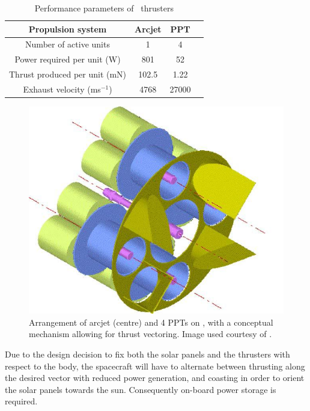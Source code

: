 \begin{table} [h]
\caption{Performance parameters of \BW\ thrusters}
\label{tab:BW1-performance}
\centering
\begin{tabular} {cccc}\toprule
  Propulsion system & Arcjet & PPT \\\midrule
  Number of active units & 1 & 4 \\
  Power required per unit (W) & 801 & 52\\
  Thrust produced per unit (mN) & 102.5 & 1.22\\
  Exhaust velocity (ms$^{-1}$) & 4768 & 27000\\\bottomrule
\end{tabular}
\end{table}

\begin{figure} [h] 
\caption{Arrangement of arcjet (centre) and 4 PPTs on \BW, with a conceptual mechanism allowing for thrust vectoring. Image used courtesy of \textcite{Roeser2006}.} 
\label{fig:Thrust-vectoring}
\centering
\includegraphics[scale=0.25]{Images/thrust-vectoring.JPG}
\end{figure}

Due to the design decision to fix both the solar panels and the thrusters with respect to the body, the spacecraft will have to alternate between thrusting along the desired vector with reduced power generation, and coasting in order to orient the solar panels towards the sun. Consequently on-board power storage is required.

